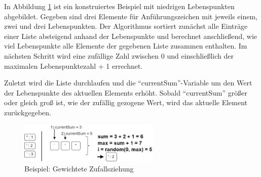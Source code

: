 \FloatBarrier
In Abbildung \ref{fig:SmartGrazer-weightedRandomExample} ist ein konstruiertes Beispiel mit niedrigen Lebenspunkten abgebildet. Gegeben sind drei Elemente für Anführungszeichen mit jeweils einem, zwei und drei Lebenspunkten. Der Algorithmus sortiert zunächst alle Einträge einer Liste absteigend anhand der Lebenspunkte und berechnet anschließend, wie viel Lebenspunkte alle Elemente der gegebenen Liste zusammen enthalten. Im nächsten Schritt wird eine zufällige Zahl zwischen 0 und einschließlich der maximalen Lebenspunktezahl + 1 errechnet.

Zuletzt wird die Liste durchlaufen und die ``currentSum''-Variable um den Wert der Lebenspunkte des aktuellen Elements erhöht. Sobald ``currentSum'' größer oder gleich groß ist, wie der zufällig gezogene Wert, wird das aktuelle Element zurückgegeben.

\begin{figure}[htbp] 
	\centering
	\includegraphics[width=0.60\textwidth]{contents/images/SmartGrazerWeightedRandomExample}
	\caption{Beispiel: Gewichtete Zufallsziehung }
	\label{fig:SmartGrazer-weightedRandomExample}
\end{figure}